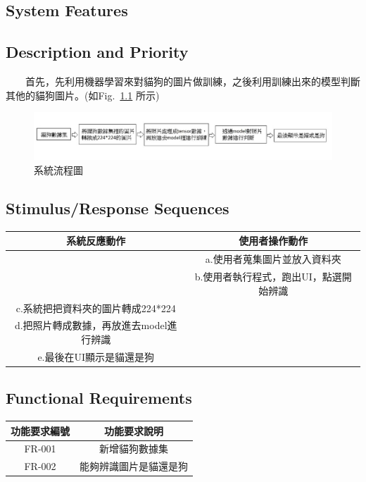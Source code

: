\documentclass{scrreprt}
\begin{document}
\begin{CJK*}{UTF8}{bsmi}
\chapter{System Features}

\section{Description and Priority}
　　首先，先利用機器學習來對貓狗的圖片做訓練，之後利用訓練出來的模型判斷其他的貓狗圖片。(如Fig. \,\ref{fig:4.1} 所示)\\
\begin{figure}[h]
\begin{center}
\includegraphics[width=18cm]{process.jpg} 
\end{center} 
\label{fig:4.1} 
\caption{系統流程圖} 
\end{figure}
\section{Stimulus/Response Sequences}\begin{center}
    \begin{tabular}{|c|c|}
        \hline
	    系統反應動作 & 使用者操作動作 \\
        \hline
	    &a.使用者蒐集圖片並放入資料夾 \\ 
        \hline
	    &b.使用者執行程式，跑出UI，點選開始辨識 \\
        \hline
	   c.系統把把資料夾的圖片轉成224*224 & \\
        \hline
	  d.把照片轉成數據，再放進去model進行辨識 & \\
        \hline
	   e.最後在UI顯示是貓還是狗 & \\
        \hline
    \end{tabular}
\end{center}




\section{Functional Requirements}
\begin{center}
    \begin{tabular}{|c|c|}
        \hline
	    功能要求編號 & 功能要求說明 \\
        \hline
	    FR-001 & 新增貓狗數據集\\ 
        \hline
	    FR-002 & 能夠辨識圖片是貓還是狗\\
        \hline
    \end{tabular}
\end{center}




\end{CJK*}
\end{document}
